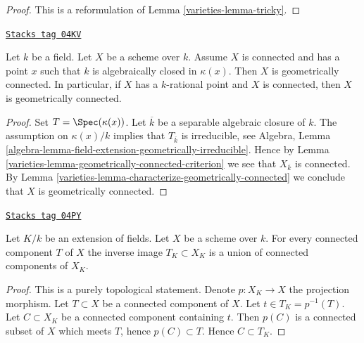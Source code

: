 \begin{proof}

This is a reformulation of
Lemma \ref{varieties-lemma-tricky}.
\end{proof}

\begin{lemma}
\label{varieties-lemma-geometrically-connected-if-connected-and-point}
\href{https://stacks.math.columbia.edu/tag/04KV}{\texttt{Stacks tag 04KV}}

Let $k$ be a field. Let $X$ be a scheme over $k$.
Assume $X$ is connected and has a point $x$ such that
$k$ is algebraically closed in $\kappa(x)$.
Then $X$ is geometrically connected.
In particular, if $X$ has a $k$-rational point and $X$ is connected,
then $X$ is geometrically connected.
\end{lemma}

\begin{proof}

Set $T = \Spec(\kappa(x))$. Let $\overline{k}$ be a
separable algebraic closure of $k$. The assumption on $\kappa(x)/k$
implies that $T_{\overline{k}}$ is irreducible, see
Algebra, Lemma \ref{algebra-lemma-field-extension-geometrically-irreducible}.
Hence by
Lemma \ref{varieties-lemma-geometrically-connected-criterion}
we see that $X_{\overline{k}}$ is connected. By
Lemma \ref{varieties-lemma-characterize-geometrically-connected}
we conclude that $X$ is geometrically connected.
\end{proof}

\begin{lemma}
\label{varieties-lemma-inverse-image-connected-component}
\href{https://stacks.math.columbia.edu/tag/04PY}{\texttt{Stacks tag 04PY}}

Let $K/k$ be an extension of fields.
Let $X$ be a scheme over $k$.
For every connected component $T$ of $X$ the inverse image
$T_K \subset X_K$ is a union of connected components of $X_K$.
\end{lemma}

\begin{proof}
This is a purely topological statement.
Denote $p : X_K \to X$ the projection morphism.
Let $T \subset X$ be a connected component of $X$.
Let $t \in T_K = p^{-1}(T)$. Let $C \subset X_K$ be a connected component
containing $t$. Then $p(C)$ is a connected subset of $X$
which meets $T$, hence $p(C) \subset T$. Hence $C \subset T_K$.
\end{proof}

